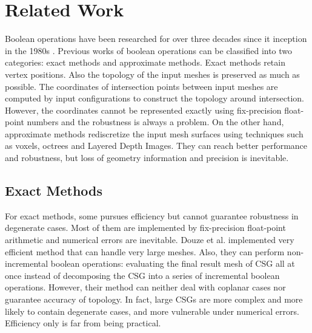 \documentclass[10pt,journal,compsoc]{IEEEtran}
\begin{document}
\section{Related Work}

Boolean operations have been researched for over three decades since it inception in the 1980s \cite{requicha1985boolean, laidlaw1986constructive}. Previous works of boolean operations can be classified into two categories: exact methods and approximate methods. Exact methods retain vertex positions. Also the topology of the input meshes is preserved as much as possible. The coordinates of intersection points between input meshes are computed by input configurations to construct the topology around intersection. However, the coordinates cannot be represented exactly using fix-precision float-point numbers and the robustness is always a problem. On the other hand, approximate methods rediscretize the input mesh surfaces using techniques such as voxels, octrees and Layered Depth Images. They can reach better performance and robustness, but loss of geometry information and precision is inevitable.

\subsection{Exact Methods}

For exact methods, some \cite{ogayar2015deferred,douze2015quickcsg,zhou2016mesh,xu2013fast,feito2013fast} pursues efficiency but cannot guarantee robustness in degenerate cases. Most of them are implemented by fix-precision float-point arithmetic and numerical errors are inevitable. Douze et al. \cite{douze2015quickcsg} implemented very efficient method that can handle very large meshes. Also, they can perform non-incremental boolean operations: evaluating the final result mesh of CSG all at once instead of decomposing the CSG into a series of incremental boolean operations. However, their method can neither deal with coplanar cases nor guarantee accuracy of topology. In fact, large CSGs are more complex and more likely to contain degenerate cases, and more vulnerable under numerical errors. Efficiency only is far from being practical.
\end{document}
